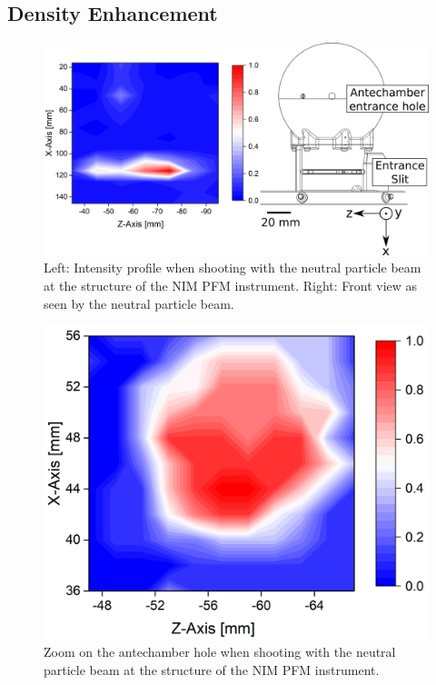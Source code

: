 	\subsection{Density Enhancement }\label{chap:expDensEntSlit}
	\begin{figure}[h!]
		\centering
		\includegraphics[width=\textwidth]{Experiments/2D_scan_anteEntr.png}
		\caption{Left: Intensity profile when shooting with the neutral particle beam at the structure of the NIM PFM instrument. Right: Front view as seen by the neutral particle beam.}
		\label{exp:PFMIntCharTot}
	\end{figure}
	\begin{figure}[h!]
		\centering
		\includegraphics[width=.6\textwidth]{Experiments/2D_scan_Ant.png}
		\caption{Zoom on the antechamber hole when shooting with the neutral particle beam at the structure of the NIM PFM instrument.}
		\label{exp:PFMIntCharAnt}
	\end{figure}	
